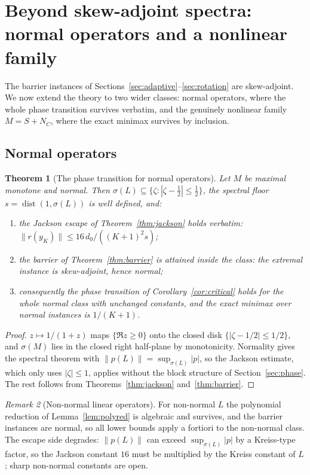 \documentclass[11pt]{article}
\newtheorem{theorem}{Theorem}[section]
\theoremstyle{definition}
\theoremstyle{remark}
\newtheorem{remark}[theorem]{Remark}
\DeclareMathOperator{\dist}{dist}
\newcommand{\norm}[1]{\| #1 \|}
\newcommand{\abs}[1]{| #1 |}
\begin{document}
\section{Beyond skew-adjoint spectra: normal operators and a nonlinear
family}\label{sec:beyond}

The barrier instances of Sections~\ref{sec:adaptive}--\ref{sec:rotation}
are skew-adjoint. We now extend the theory to two wider classes: normal
operators, where the whole phase transition survives verbatim, and the
genuinely nonlinear family $M=S+N_C$, where the exact minimax survives by
inclusion.

\subsection{Normal operators}

\begin{theorem}[The phase transition for normal operators]\label{thm:normal}
Let $M$ be maximal monotone and \emph{normal}. Then
$\sigma(L)\subseteq\{\zeta:\abs{\zeta-\tfrac12}\le\tfrac12\}$, the
spectral floor $s=\dist(1,\sigma(L))$ is well defined, and:
\begin{enumerate}[label=(\roman*)]
\item the Jackson escape of Theorem~\ref{thm:jackson} holds verbatim:
      $\norm{r(y_K)}\le16\,d_0/((K+1)^2s)$;
\item the barrier of Theorem~\ref{thm:barrier} is attained inside the
      class: the extremal instance is skew-adjoint, hence normal;
\item consequently the phase transition of Corollary~\ref{cor:critical}
      holds for the whole normal class with unchanged constants, and the
      exact minimax over normal instances is $1/(K+1)$.
\end{enumerate}
\end{theorem}
\begin{proof}
$z\mapsto1/(1+z)$ maps $\{\Re z\ge0\}$ onto the closed disk
$\{\abs{\zeta-1/2}\le1/2\}$, and $\sigma(M)$ lies in the closed right
half-plane by monotonicity. Normality gives the spectral theorem with
$\norm{p(L)}=\sup_{\sigma(L)}\abs p$, so the Jackson estimate, which only
uses $\abs\zeta\le1$, applies without the block structure of
Section~\ref{sec:phase}. The rest follows from
Theorems~\ref{thm:jackson} and~\ref{thm:barrier}.
\end{proof}

\begin{remark}[Non-normal linear operators]\label{rem:nonnormal}
For non-normal $L$ the polynomial reduction of Lemma~\ref{lem:polyred} is
algebraic and survives, and the barrier instances are normal, so all lower
bounds apply a fortiori to the non-normal class. The escape side degrades:
$\norm{p(L)}$ can exceed $\sup_{\sigma(L)}\abs p$ by a Kreiss-type factor,
so the Jackson constant $16$ must be multiplied by the Kreiss constant of
$L$; sharp non-normal constants are open.
\end{remark}
\end{document}
